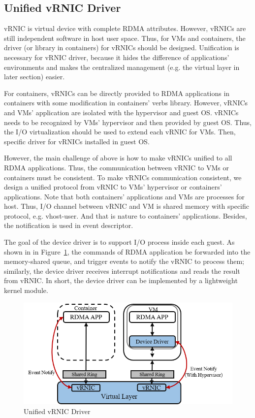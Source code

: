 \subsection{Unified vRNIC Driver}
vRNIC is virtual device with complete RDMA attributes. However, vRNICs are still independent software in host user space. Thus, for VMs and containers, the driver (or library in containers) for vRNICs should be designed. Unification is necessary for vRNIC driver, because it hides the difference of applications' environments and makes the centralized management (e.g. the virtual layer in later section) easier.

For containers, vRNICs can be directly provided to RDMA applications in containers with some modification in containers' verbs library. However, vRNICs  and VMs' application are isolated with the hypervisor and guest OS. vRNICs needs to be recognized by VMs' hypervisor and then provided by guest OS. Thus, the I/O virtualization should be used to extend each vRNIC for VMs. Then, specific driver for vRNICs installed in guest OS. 

However, the main challenge of above is how to make vRNICs unified to all RDMA applications. Thus, the communication between vRNIC to VMs or containers must be consistent. To make vRNICs communication consistent, we design a unified protocol from vRNIC to VMs' hypervisor or containers' applications. Note that both containers' applications and VMs are processes for host. Thus, I/O channel between vRNIC and VM is shared memory with specific protocol, e.g. vhost-user. And that is nature to containers' applications. Besides, the notification is used in event descriptor.

The goal of the device driver is to support I/O process inside each guest. As shown in in Figure~\ref{fig:vrnic-driver},  the commands of RDMA application be forwarded into the memory-shared queue, and trigger events to notify the vRNIC to process them; similarly, the device driver receives interrupt notifications and reads the result from vRNIC. In short, the device driver can be implemented by a lightweight kernel module.

\begin{figure}[!ht]
\centering
\includegraphics[width=1.0\linewidth]{images/interface-general}
\caption{Unified vRNIC Driver}
\label{fig:vrnic-driver}
\end{figure}

